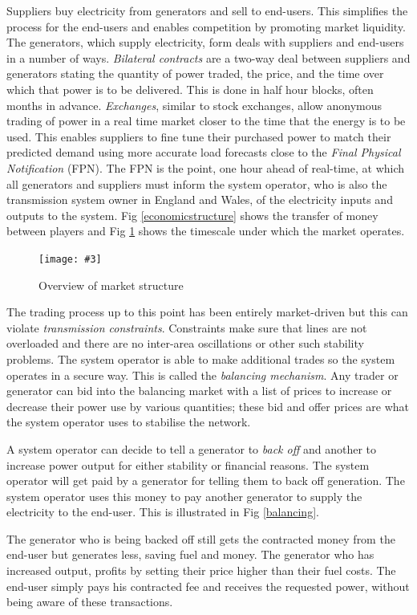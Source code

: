 \documentclass[a4paper,oneside,12pt]{report}
\newcommand{\image}[3] {
  \begin{figure}
    \begin{center}
      \texttt{[image: \#3]}
      \caption{#2}
      \label{#1}
    \end{center}
  \end{figure}
}
\begin{document}
Suppliers buy electricity from generators and sell to end-users. This simplifies the process for the end-users and enables competition by promoting market liquidity. The generators, which supply electricity, form deals with suppliers and end-users in a number of ways. \emph{Bilateral contracts} are a two-way deal between suppliers and generators stating the quantity of power traded, the price, and the time over which that power is to be delivered. This is done in half hour blocks, often months in advance. \emph{Exchanges}, similar to stock exchanges, allow anonymous trading of power in a real time market closer to the time that the energy is to be used. This enables suppliers to fine tune their purchased power to match their predicted demand using more accurate load forecasts close to the \emph{Final Physical Notification} (FPN). The FPN is the point, one hour ahead of real-time, at which all generators and suppliers must inform the system operator, who is also the transmission system owner in England and Wales, of the electricity inputs and outputs to the system. Fig \ref{economicstructure} shows the transfer of money between players and Fig \ref{ukmarket} shows the timescale under which the market operates.

\image{ukmarket}{Overview of market structure}{ukmarket.png}

The trading process up to this point has been entirely market-driven but this can violate \emph{transmission constraints}. Constraints make sure that lines are not overloaded and there are no inter-area oscillations or other such stability problems. The system operator is able to make additional trades so the system operates in a secure way. This is called the \emph{balancing mechanism}. Any trader or generator can bid into the balancing market with a list of prices to increase or decrease their power use by various quantities; these bid and offer prices are what the system operator uses to stabilise the network.

A system operator can decide to tell a generator to \emph{back off} and another to increase power output for either stability or financial reasons. The system operator will get paid by a generator for telling them to back off generation. The system operator uses this money to pay another generator to supply the electricity to the end-user. This is illustrated in Fig \ref{balancing}.

The generator who is being backed off still gets the contracted money from the end-user but generates less, saving fuel and money. The generator who has increased output, profits by setting their price higher than their fuel costs. The end-user simply pays his contracted fee and receives the requested power, without being aware of these transactions.
\end{document}
